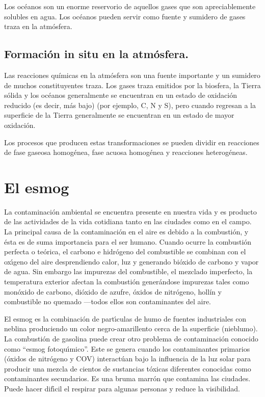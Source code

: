 Los océanos son un enorme reservorio de aquellos gases que son apreciablemente solubles en agua. Los océanos pueden servir como fuente y sumidero de gases traza en la atmósfera.

\subsection{Formación in situ en la atmósfera.}

Las reacciones químicas en la atmósfera son una fuente importante y un sumidero de muchos constituyentes traza. Los gases traza emitidos por la biosfera, la Tierra sólida y los océanos generalmente se encuentran en un estado de oxidación reducido (es decir, más bajo) (por ejemplo, C, N y S), pero cuando regresan a la superficie de la Tierra generalmente se encuentran en un estado de  mayor oxidación.

Los procesos que producen estas transformaciones se pueden dividir en reacciones de fase gaseosa homogénea, fase acuosa homogénea y reacciones heterogéneas.

 \section{El esmog}

 La contaminaci\'on ambiental se encuentra presente en nuestra vida y es producto de las actividades de la vida cotidiana tanto en las ciudades como en el campo. La principal causa de la contaminaci\'on en el aire es debido a la combusti\'on, y \'esta es de suma importancia para el ser humano. Cuando ocurre la combusti\'on perfecta o te\'orica, el carbono e hidr\'ogeno del combustible se combinan con el ox\'{\i}geno del aire desprendiendo calor, luz y generando bi\'oxido de carbono y vapor de agua. Sin embargo las impurezas del combustible, el mezclado imperfecto, la temperatura exterior afectan la combusti\'on generándose impurezas tales como mon\'oxido de carbono, di\'oxido de azufre, \'oxidos de nitr\'ogeno, holl\'in y combustible no quemado ---todos ellos son contaminantes del aire.
 
 El esmog es la combinaci\'on de part\'{\i}culas de humo de fuentes industriales con neblina produciendo un color negro-amarillento cerca de la superficie (nieblumo). La combusti\'on de gasolina puede crear otro problema de contaminaci\'on conocido como ``esmog fotoqu\'{\i}mico''. Este se genera cuando los contaminantes primarios (\'oxidos de nitr\'ogeno y COV) interact\'uan bajo la influencia de la luz solar para producir una mezcla de cientos de sustancias t\'oxicas diferentes conocidas como contaminantes secundarios. Es una bruma marr\'on que contamina las ciudades. Puede hacer dif\'{\i}cil el respirar para algunas personas y reduce la visibilidad.

